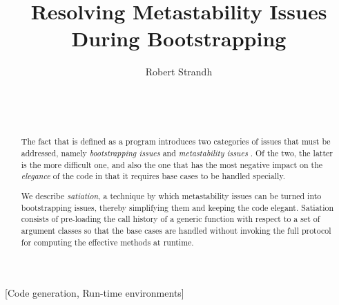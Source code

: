 \documentclass{acm_proc_article-sp}
\def\inputtex#1{}
\begin{document}
\title{Resolving Metastability Issues During Bootstrapping}
\author{\alignauthor
Robert Strandh\\
\\
\\
\\
}


\maketitle

\begin{abstract}
The fact that \clos{} is defined as a \clos{} program introduces two
categories of issues that must be addressed, namely
\emph{bootstrapping issues} and \emph{metastability issues}
\cite{Kiczales:1991:AMP:574212}.  Of the two, the latter is the more
difficult one, and also the one that has the most negative impact on
the \emph{elegance} of the code in that it requires base cases to be
handled specially.

We describe \emph{satiation}, a technique by which metastability
issues can be turned into bootstrapping issues, thereby simplifying
them and keeping the code elegant.  Satiation consists of pre-loading
the call history of a generic function with respect to a set of
argument classes so that the base cases are handled without invoking
the full protocol for computing the effective methods at runtime.
\end{abstract}

[Code generation, Run-time environments]

\inputtex{sec-introduction.tex}
\inputtex{sec-previous.tex}
\inputtex{sec-our-method.tex}
\inputtex{sec-conclusions.tex}



\end{document}
